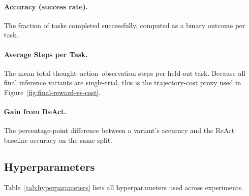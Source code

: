 \paragraph{Accuracy (success rate).}
The fraction of tasks completed successfully, computed as a binary outcome per task.

\paragraph{Average Steps per Task.}
The mean total thought--action--observation steps per held-out task. Because all final inference variants are single-trial, this is the trajectory-cost proxy used in Figure~\ref{fig:final-reward-vs-cost}.

\paragraph{Gain from ReAct.}
The percentage-point difference between a variant's accuracy and the ReAct baseline accuracy on the same split.

\subsection{Hyperparameters}
\label{app:hyperparameters}

Table~\ref{tab:hyperparameters} lists all hyperparameters used across experiments.

